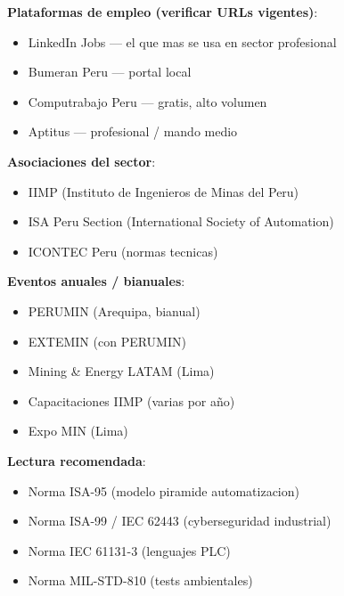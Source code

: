 \documentclass[11pt,a4paper,oneside]{report}
\begin{document}
\textbf{Plataformas de empleo (verificar URLs vigentes)}:
\begin{itemize}[leftmargin=2em]
  \item LinkedIn Jobs --- el que mas se usa en sector profesional
  \item Bumeran Peru --- portal local
  \item Computrabajo Peru --- gratis, alto volumen
  \item Aptitus --- profesional / mando medio
\end{itemize}

\textbf{Asociaciones del sector}:
\begin{itemize}[leftmargin=2em]
  \item IIMP (Instituto de Ingenieros de Minas del Peru)
  \item ISA Peru Section (International Society of Automation)
  \item ICONTEC Peru (normas tecnicas)
\end{itemize}

\textbf{Eventos anuales / bianuales}:
\begin{itemize}[leftmargin=2em]
  \item PERUMIN (Arequipa, bianual)
  \item EXTEMIN (con PERUMIN)
  \item Mining \& Energy LATAM (Lima)
  \item Capacitaciones IIMP (varias por año)
  \item Expo MIN (Lima)
\end{itemize}

\textbf{Lectura recomendada}:
\begin{itemize}[leftmargin=2em]
  \item Norma ISA-95 (modelo piramide automatizacion)
  \item Norma ISA-99 / IEC 62443 (cyberseguridad industrial)
  \item Norma IEC 61131-3 (lenguajes PLC)
  \item Norma MIL-STD-810 (tests ambientales)
\end{itemize}
\end{document}

